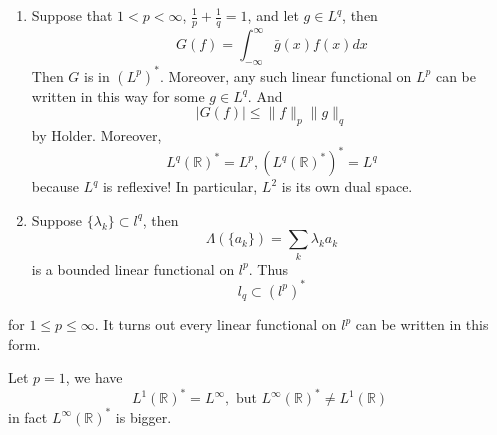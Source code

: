 \documentclass[openany]{book}
\newcommand{\R}{\mathbb{R}}
\begin{document}
\begin{example}
    \begin{enumerate}
        \item Suppose that $1<p<\infty$, $\frac{1}{p}+\frac{1}{q}=1$, and let $g\in L^q$, then 
        \begin{equation*}
            G(f)=\int_{-\infty}^\infty\bar{g}(x)f(x)dx
        \end{equation*}
        Then $G$ is in $(L^p)^*$. Moreover, any such linear functional on $L^p$ can be written in this way for some $g\in L^q$. And 
        \begin{equation*}
            |G(f)|\leq\|f\|_p\|g\|_q
        \end{equation*}
        by Holder. Moreover, 
        \begin{equation*}
            L^q(\R)^*=L^p, (L^q(\R)^*)^*=L^q
        \end{equation*}
        because $L^q$ is reflexive! In particular, $L^2$ is its own dual space.
        \item Suppose $\{\lambda_k\}\subset l^q$, then 
        \begin{equation*}
            \Lambda(\{a_k\})=\sum_k\lambda_ka_k
        \end{equation*}
        is a bounded linear functional on $l^p$. Thus 
        \begin{equation*}
            l_q\subset (l^p)^*
        \end{equation*}
    \end{enumerate}
    for $1\leq p\leq\infty$. It turns out every linear functional on $l^p$ can be written in this form.
\end{example}
\begin{example}
    Let $p=1$, we have 
    \begin{equation*}
        L^1(\R)^*=L^\infty, \text{ but } L^\infty(\R)^*\neq L^1(\R)
    \end{equation*}
    in fact $L^\infty(\R)^*$ is bigger. 
\end{example}
\end{document}
